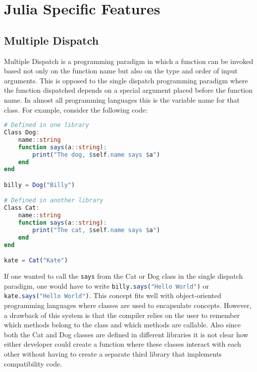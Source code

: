 \setcounter{chapter}{3}
\setcounter{section}{0}
\setcounter{subsection}{0}
\chapter*{Julia Specific Features}
\section{Multiple Dispatch}
Multiple Dispatch is a programming paradigm in which a function can be invoked based not only on the function name but
also on the type and order of input arguments. This is opposed to the single dispatch programming paradigm where the
function dispatched depends on a special argument placed before the function name. In almost all programming languages
this is the variable name for that class. For example, consider the following code: \hfill
\begin{lstlisting}[language=Julia]
# Defined in one library
Class Dog:
    name::string
    function says(a::string):
        print("The dog, $self.name says $a")
    end
end

billy = Dog("Billy")

# Defined in another library
Class Cat:
    name::string
    function says(a::string):
        print("The cat, $self.name says $a")
    end
end

kate = Cat("Kate")
\end{lstlisting}
If one wanted to call the \lstinline[language=Julia]{says} from the Cat or Dog class in the single dispatch paradigm,
one would have to write \lstinline[language=Julia]{billy.says("Hello World")} or
\lstinline[language=Julia]{kate.says("Hello World")}. This concept fits well with object-oriented programming languages
where classes are used to encapsulate concepts. However, a drawback of this system is that the compiler relies on the
user to remember which methods belong to the class and which methods are callable. Also since both the Cat and Dog
classes are defined in different libraries it is not clear how either developer could create a function where these
classes interact with each other without having to create a separate third library that implements compatibility code.

